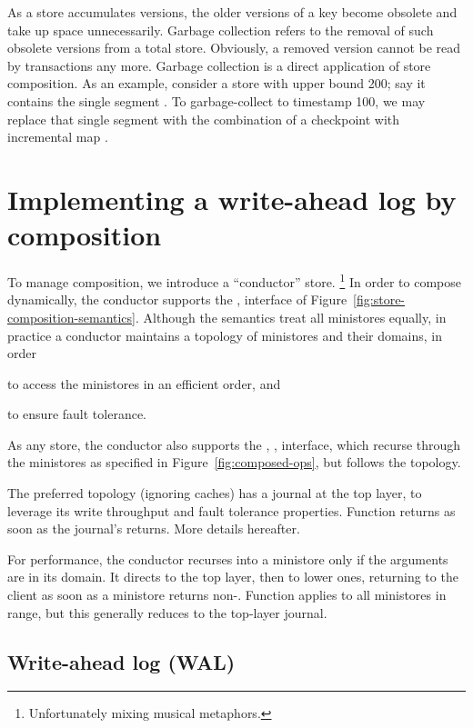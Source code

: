 As a store accumulates versions, the older versions of a key become
obsolete and take up space unnecessarily.
Garbage collection refers to the removal of such obsolete versions from
a total store.
Obviously, a removed version cannot be read by transactions any more.
Garbage collection is a direct application of store composition.
As an example, consider a store with upper bound 200; say it contains
the single segment .
To garbage-collect to timestamp 100, we may replace that single segment
with the combination of a checkpoint 
with incremental map .

\section{Implementing a write-ahead log by composition}
\label{sec:conductor}

To manage composition, we introduce a ``conductor'' store.%
%
\footnote{
%
  Unfortunately mixing musical metaphors.
}
%
In order to compose dynamically, the conductor supports the \addmini{},
\rmvmini{} interface of Figure~\ref{fig:store-composition-semantics}.
Although the semantics treat all ministores equally, in practice a
conductor maintains a topology of ministores and their domains, in order
\begin{inparaenum}
\item
  to access the ministores in an efficient order, and
\item
  to ensure fault tolerance.
\end{inparaenum}
As any store, the conductor also supports the \lookup{}, \doUpdate{},
\doCommit{} interface, which recurse through the ministores as specified
in Figure~\ref{fig:composed-ops}, but follows the topology.

The preferred topology (ignoring caches) has a journal at the top layer,
to leverage its write throughput and fault tolerance
properties.
Function \doCommit{} returns as soon as the journal's \doCommit{}
returns.
More details hereafter.

For performance, the conductor recurses into a ministore only if the
arguments are in its domain.
It directs \lookup{} to the top layer, then to lower ones, returning to
the client as soon as a ministore returns non-\bottom{}.
Function \doUpdate{} applies to all ministores in range, but this
generally reduces to the top-layer journal.

\subsection{Write-ahead log (WAL)}
\label{sec:WAL}

